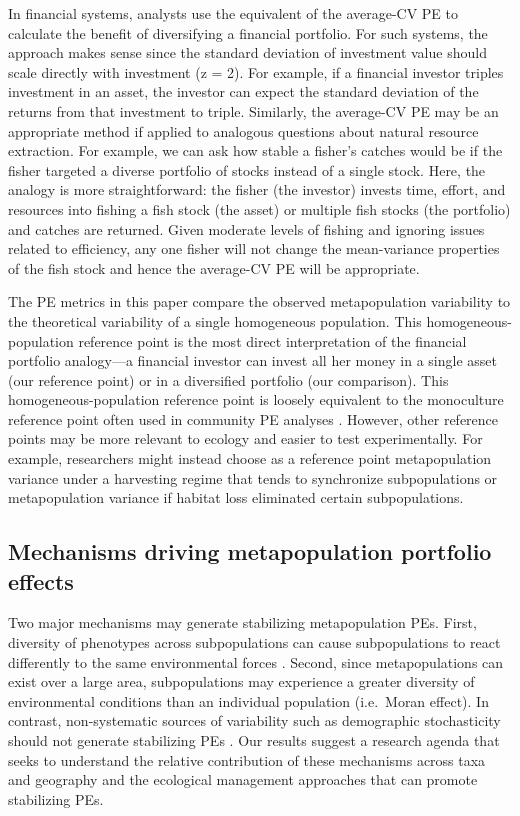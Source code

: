 In financial systems, analysts use the equivalent of the average-CV PE to
calculate the benefit of diversifying a financial portfolio. For such systems,
the approach makes sense since the standard deviation of investment value should
scale directly with investment (z = 2). For example, if a financial investor
triples investment in an asset, the investor can expect the standard deviation
of the returns from that investment to triple. Similarly, the average-CV PE may
be an appropriate method if applied to analogous questions about natural
resource extraction. For example, we can ask how stable a fisher's catches would
be if the fisher targeted a diverse portfolio of stocks instead of a single
stock. Here, the analogy is more straightforward: the fisher (the investor)
invests time, effort, and resources into fishing a fish stock (the asset) or
multiple fish stocks (the portfolio) and catches are returned. Given moderate
levels of fishing and ignoring issues related to efficiency, any one fisher
will not change the mean-variance properties of the fish stock and hence the
average-CV PE will be appropriate.

The PE metrics in this paper compare the observed metapopulation variability to
the theoretical variability of a single homogeneous population. This
homogeneous-population reference point is the most direct interpretation of the
financial portfolio analogy---a financial investor can invest all her money
in a single asset (our reference point) or in a diversified portfolio (our
comparison). This homogeneous-population reference point is loosely equivalent
to the monoculture reference point often used in community PE analyses
\citep[e.g. Equation 7 in][]{thibaut2013}. However, other reference points
may be more relevant to ecology and easier to test experimentally. For example,
researchers might instead choose as a reference point metapopulation variance
under a harvesting regime that tends to synchronize subpopulations or
metapopulation variance if habitat loss eliminated certain subpopulations.

\subsection{Mechanisms driving metapopulation portfolio effects}

Two major mechanisms may generate stabilizing metapopulation PEs.
First, diversity of phenotypes across subpopulations can cause subpopulations
to react differently to the same environmental forces \citep[response
diversity;][]{elmqvist2003}. Second, since metapopulations can exist over
a large area, subpopulations may experience a greater diversity of
environmental conditions than an individual population (i.e.\ Moran effect). In
contrast, non-systematic sources of variability such as demographic
stochasticity should not generate stabilizing PEs \citep{loreau2008}. Our
results suggest a research agenda that seeks to understand the relative
contribution of these mechanisms across taxa and geography and the ecological
management approaches that can promote stabilizing PEs.

